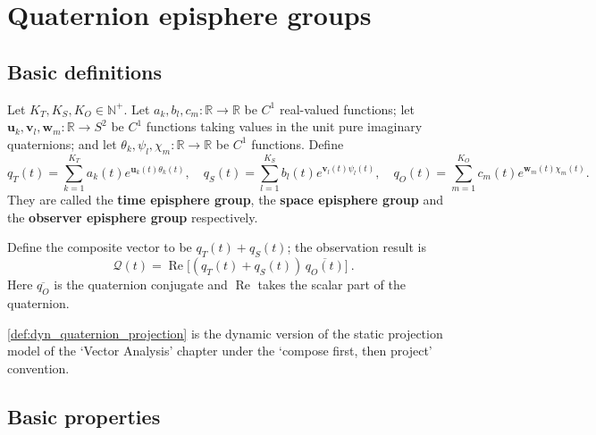 \section{Quaternion episphere groups}
\label{sec:dyn_quaternion_single}

\subsection{Basic definitions}

\begin{definition}\label{def:dyn_quaternion_group}
Let $K_T,K_S,K_O\in\mathbb N^+$. Let $a_k,b_l,c_m:\mathbb R\to\mathbb R$ be $C^1$ real-valued functions; let $\mathbf u_k,\mathbf v_l,\mathbf w_m:\mathbb R\to S^2$ be $C^1$ functions taking values in the unit pure imaginary quaternions; and let $\theta_k,\psi_l,\chi_m:\mathbb R\to\mathbb R$ be $C^1$ functions. Define
\[
q_T(t)=\sum_{k=1}^{K_T}a_k(t)e^{\mathbf u_k(t)\theta_k(t)},\quad
q_S(t)=\sum_{l=1}^{K_S}b_l(t)e^{\mathbf v_l(t)\psi_l(t)},\quad
q_O(t)=\sum_{m=1}^{K_O}c_m(t)e^{\mathbf w_m(t)\chi_m(t)}.
\]
They are called the \textbf{time episphere group}, the \textbf{space episphere group} and the \textbf{observer episphere group} respectively.
\end{definition}

\begin{definition}\label{def:dyn_quaternion_projection}
Define the composite vector to be $q_T(t)+q_S(t)$; the observation result is
\[
\boxed{\ \mathcal Q(t)=\operatorname{Re}\!\big[(q_T(t)+q_S(t))\,\overline{q_O(t)}\big]\ }.
\]
Here $\overline{q_O}$ is the quaternion conjugate and $\operatorname{Re}$ takes the scalar part of the quaternion.
\end{definition}

\begin{remark}\label{rem:dyn_quaternion_static_relation}
\cref{def:dyn_quaternion_projection} is the dynamic version of the static projection model of the `Vector Analysis' chapter under the `compose first, then project' convention.
\end{remark}

\subsection{Basic properties}

